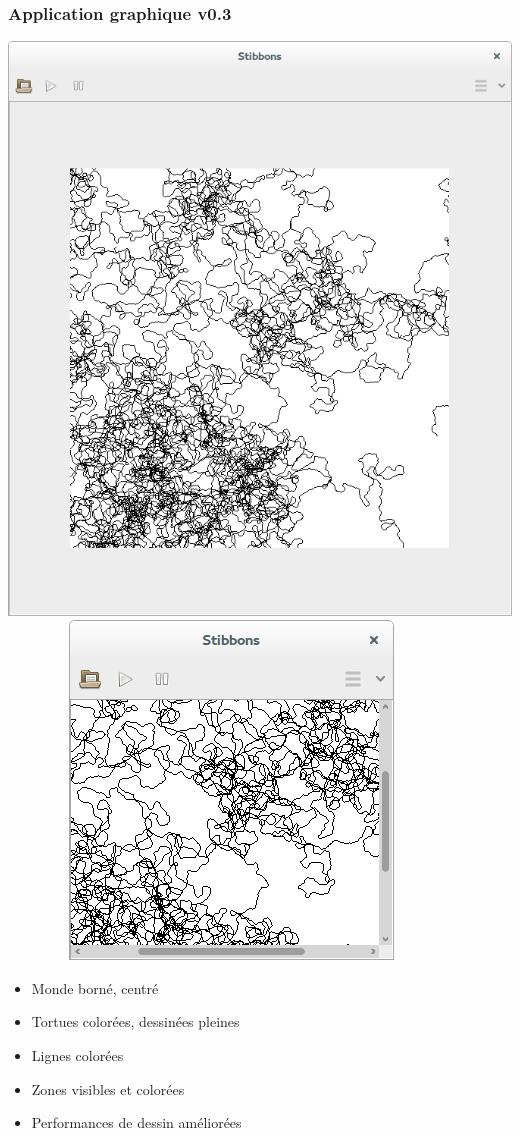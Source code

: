 \begin{frame}
\frametitle{Application graphique v0.3}
\begin{center}
\includegraphics[scale=0.16]{doc/report/screenshot/stibbons-0-3-2.png}
~~~~~~~~
\includegraphics[scale=0.16]{doc/report/screenshot/stibbons-0-3-3.png}
\end{center}

\begin{itemize}
	\item Monde borné, centré
	\item Tortues colorées, dessinées pleines
	\item Lignes colorées
	\item Zones visibles et colorées
	\item Performances de dessin améliorées
\end{itemize}
\end{frame}

